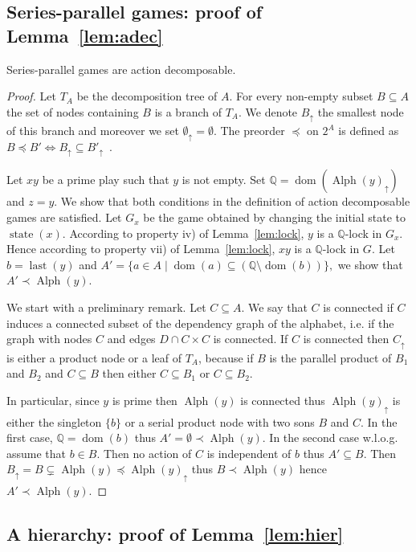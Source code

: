 \documentclass[a4paper,UKenglish]{lipics-v2016}
\newcommand{\QQ}{\mathbb{Q}}
\DeclareMathOperator{\dom}{dom}
\DeclareMathOperator{\last}{last}
\DeclareMathOperator{\alphabet}{Alph}
\DeclareMathOperator{\state}{state}
\begin{document}
\subsection{Series-parallel games: proof of Lemma~\ref{lem:adec}}


{Series-parallel games
are action decomposable.
}
\begin{proof}
Let $T_A$ be the decomposition tree of $A$.
For every non-empty subset $B\subseteq A$ the set of nodes containing $B$
is a branch of $T_A$.
We denote $B_\uparrow$ the smallest node of this branch and moreover we set $\emptyset_\uparrow=\emptyset$.
The preorder $\preceq$ on $2^A$ is defined as 
$
B \preceq B' \iff B_\uparrow \subseteq B'_\uparrow\enspace.
$

Let $xy$ be a prime play such that $y$ is not empty.
Set $\QQ = \dom(\alphabet(y)_\uparrow)$ and $z=y$.
We show that both conditions in
the definition of action decomposable games are satisfied.
Let $G_x$ be the game obtained by changing the initial state to $\state(x)$.
According to property iv) of Lemma~\ref{lem:lock}, $y$ is a $\QQ$-lock in $G_x$. Hence according to 
property vii) of Lemma~\ref{lem:lock}, $xy$ is a $\QQ$-lock in $G$.
Let
$b=\last(y)$ and
$
A'=  \{ a \in A \mid \dom(a) \subseteq (\QQ \setminus \dom(b)) \},
$
we show that $A'\prec \alphabet(y)$.


We start with a preliminary remark.
Let $C\subseteq A$.
We say that $C$ is connected if 
$C$ induces a connected subset of the dependency graph of the alphabet, i.e. if the graph with nodes $C$ and edges $D \cap C\times C$ is connected.
If $C$ is connected then $C_\uparrow$ is either a product node or a leaf of $T_A$, because if $B$ is the parallel product of $B_1$ and $B_2$ and $C\subseteq B$ then either $C\subseteq B_1$ or $C\subseteq B_2$.

In particular, since $y$ is prime then $\alphabet(y)$ is connected 
thus $\alphabet(y)_\uparrow$ is either the singleton $\{b\}$
 or a serial product node with two sons $B$ and $C$.
In the first case, $\QQ=\dom(b)$ thus $A'=\emptyset \prec \alphabet(y)$.
In the second case w.l.o.g. assume that $b\in B$.
Then no action of $C$ is independent of $b$
thus $A'\subseteq B$.
Then  $B_\uparrow = B \subsetneq \alphabet(y)
 \preceq \alphabet(y)_\uparrow$
thus $B \prec  \alphabet(y)$
hence
$A' \prec  \alphabet(y)$.
\end{proof}

\subsection{A hierarchy: proof of Lemma~\ref{lem:hier}}
\end{document}

